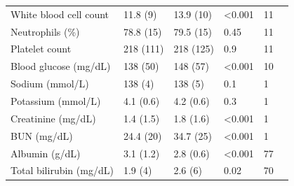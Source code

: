 \documentclass{ws-procs11x85}
\begin{document}
\begin{table}[H]
\begin{adjustbox}{width=1\textwidth}
\begin{tabular}{llllll}
\hspace{1cm} White blood cell count         & 11.8 (9)                              & 13.9 (10)                          & \textless 0.001               & 11                      &  \\
\hspace{1cm} Neutrophils (\%)         & 78.8 (15)                              & 79.5 (15)                          & 0.45             & 11                      &  \\
\hspace{1cm} Platelet count                    & 218 (111)                          & 218 (125)                      & 0.9              & 11                      &  \\
\hspace{1cm} Blood glucose (mg/dL)                                & 138 (50)                                & 148 (57)                            & \textless 0.001  & 10                      &  \\
\hspace{1cm} Sodium (mmol/L)                                      & 138 (4)                                 & 138 (5)                             & 0.1            & 1                       &  \\
\hspace{1cm} Potassium (mmol/L)                                   & 4.1 (0.6)                               & 4.2 (0.6)                           & 0.3              & 1                       &  \\
\hspace{1cm} Creatinine  (mg/dL)                                 & 1.4 (1.5)                               & 1.8 (1.6)                           & \textless 0.001  & 1                       &  \\
\hspace{1cm} BUN  (mg/dL)                                 & 24.4 (20)                               & 34.7 (25)                           & \textless 0.001  & 1                       &  \\
\hspace{1cm} Albumin (g/dL)                                       & 3.1 (1.2)                               & 2.8 (0.6)                           & \textless 0.001  & 77                      &  \\
\hspace{1cm} Total bilirubin (mg/dL)                                 & 1.9 (4)                               & 2.6 (6)                           & 0.02  & 70                     &  \\

\end{tabular}
\end{adjustbox}
\end{table}
\end{document}
